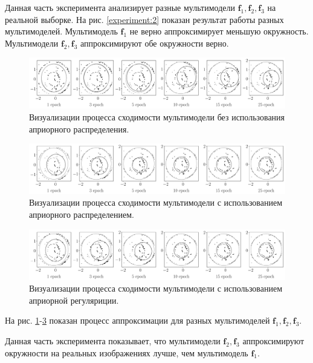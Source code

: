 Данная часть эксперимента анализирует разные мультимодели $\textbf{f}_1, \textbf{f}_2, \textbf{f}_3$ на реальной выборке.
На рис. \ref{experiment:2} показан результат работы разных мультимоделей.
Мультимодель $\textbf{f}_1$  не верно аппроксимирует меньшую окружность.
Мультимодели $\textbf{f}_2, \textbf{f}_3$ аппроксимируют обе окружности верно.

\begin{figure}[h!t]\center
\includegraphics[width=1\textwidth]{results/priorexpert/experiment_real_not_prior}
\caption{Визуализации процесса сходимости мультимодели без использования априорного распределения.}
\label{experiment:3}
\end{figure}

\begin{figure}[h!t]\center
\includegraphics[width=1\textwidth]{results/priorexpert/experiment_real_prior}
\caption{Визуализации процесса сходимости мультимодели с использованием априорного распределением.}
\label{experiment:4}
\end{figure}

\begin{figure}[h!t]\center
\includegraphics[width=1\textwidth]{results/priorexpert/experiment_real_regular}
\caption{Визуализации процесса сходимости мультимодели с использованием априорной регуляриции.}
\label{experiment:5}
\end{figure}

На рис. \ref{experiment:3}-\ref{experiment:5} показан процесс аппроксимации для разных мультимоделей $\textbf{f}_1, \textbf{f}_2, \textbf{f}_3$.

Данная часть эксперимента показывает, что мультимодели $\textbf{f}_2, \textbf{f}_3$ аппроксимируют окружности на реальных изображениях лучше, чем мультимодель $\textbf{f}_1$.